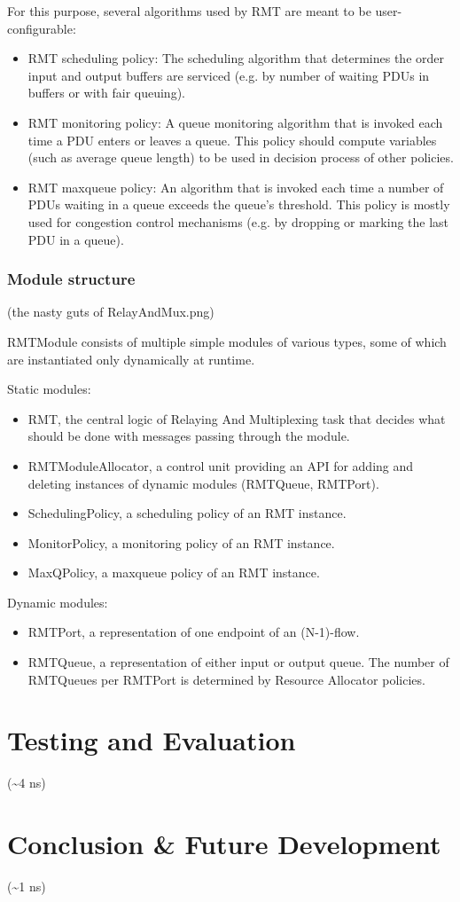             For this purpose, several algorithms used by RMT are meant to be user-configurable:

            \begin{itemize}
                \item RMT scheduling policy: The scheduling algorithm that determines the order input and output buffers are serviced (e.g. by number of waiting PDUs in buffers or with fair queuing).
                \item RMT monitoring policy: A queue monitoring algorithm that is invoked each time a PDU enters or leaves a queue. This policy should compute variables (such as average queue length) to be used in decision process of other policies.
                \item RMT maxqueue policy: An algorithm that is invoked each time a number of PDUs waiting in a queue exceeds the queue's threshold. This policy is mostly used for congestion control mechanisms (e.g. by dropping or marking the last PDU in a queue).
            \end{itemize}

        \subsection{Module structure}

            (the nasty guts of RelayAndMux.png)

            RMTModule consists of multiple simple modules of various types, some of which are instantiated only dynamically at runtime.

            Static modules:
            \begin{itemize}
                \item RMT, the central logic of Relaying And Multiplexing task that decides what should be done with messages passing through the module.
                \item RMTModuleAllocator, a control unit providing an API for adding and deleting instances of dynamic modules (RMTQueue, RMTPort).
                \item SchedulingPolicy, a scheduling policy of an RMT instance.
                \item MonitorPolicy, a monitoring policy of an RMT instance.
                \item MaxQPolicy, a maxqueue policy of an RMT instance.
            \end{itemize}

            Dynamic modules:
            \begin{itemize}
                \item RMTPort, a representation of one endpoint of an (N-1)-flow.
                \item RMTQueue, a representation of either input or output queue. The number of RMTQueues per RMTPort is determined by Resource Allocator policies.
            \end{itemize}




\chapter{Testing and Evaluation}
    (\textasciitilde4 ns)

\chapter{Conclusion \& Future Development}
    (\textasciitilde1 ns)
